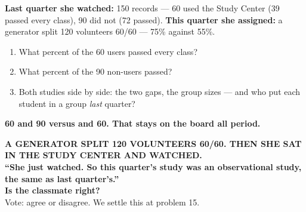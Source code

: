 \documentclass[aspectratio=169, 11pt]{beamer}
\begin{document}
\begin{frame}[t, plain]
  \vspace{0.2cm}
  \begin{center}
    \begin{minipage}{0.88\textwidth}
      \textbf{Last quarter she watched:} 150 records --- 60 used the Study Center (39 passed
      every class), 90 did not (72 passed). \textbf{This quarter she assigned:} a generator
      split 120 volunteers 60/60 --- 75\% against 55\%.
      \begin{enumerate}\setlength{\itemsep}{6pt}
        \item What percent of the 60 users passed every class?
        \item What percent of the 90 non-users passed?
        \item Both studies side by side: the two gaps, the group sizes --- and who put each
              student in a group \emph{last} quarter?
      \end{enumerate}
    \end{minipage}
  \end{center}
  \vspace{0.3cm}
  \begin{center}
    {\color{cerulean}\bfseries 60 and 90 \quad versus  and 60. That stays on the board
    all period.}
  \end{center}
\end{frame}

{
\begin{frame}[plain]
  \vspace{1.2cm}
  \begin{center}
    {\color{frostmid}\bfseries\small A GENERATOR SPLIT 120 VOLUNTEERS 60/60. THEN SHE SAT IN THE
    STUDY CENTER AND WATCHED.}\\[0.8cm]
    {\color{white}\bfseries\Large ``She just watched. So this quarter's study was an
    observational study, the same as last quarter's.''}\\[0.9cm]
    {\color{goldacc}\bfseries\large Is the classmate right?}\\[0.5cm]
    {\color{frostmid}\small Vote: agree or disagree. We settle this at problem 15.}
  \end{center}
\end{frame}
}
\end{document}
